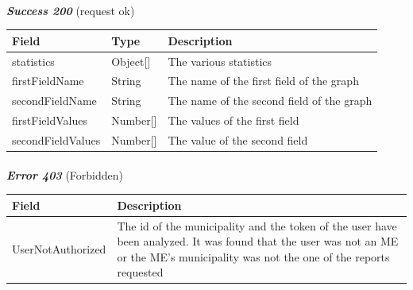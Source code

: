 						\paragraph{}
							\textit{\textbf{Success 200}} (request ok)
							\vspace{-2mm}
							\begin{table}[!h]
								\begin{tabular}{L{0.3\textwidth}L{0.15\textwidth}L{0.4\textwidth}}
									\toprule
									\textbf{Field} & \textbf{Type} & \textbf{Description} \\
									\midrule
									statistics & Object[] & The various statistics \\
									\hspace{2.5mm}firstFieldName & String & The name of the first field of the graph \\
									\hspace{2.5mm}secondFieldName & String & The name of the second field of the graph \\
									\hspace{2.5mm}firstFieldValues & Number[] & The values of the first field \\
									\hspace{2.5mm}secondFieldValues & Number[] & The value of the second field \\
								 	\bottomrule
								\end{tabular}
							\end{table}
						\clearpage
						\paragraph{}
							\textit{\textbf{Error 403}} (Forbidden)
							\vspace{-2mm}
							\begin{table}[!h]
								\begin{tabular}{L{0.4\textwidth}L{0.4\textwidth}}
									\toprule
									\textbf{Field} & \textbf{Description} \\
									\midrule
								  	UserNotAuthorized & The id of the municipality and the token of the user have been analyzed. It was found that the user was not an ME or the ME's  municipality was not the one of the reports requested  \\
								 	\bottomrule
								\end{tabular}
							\end{table}
						\vspace{-5mm}
